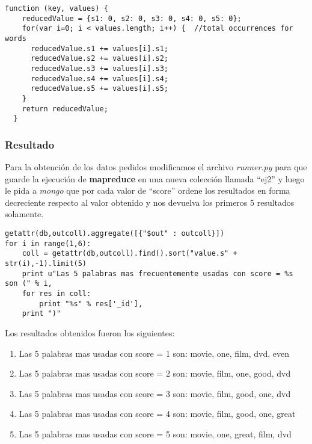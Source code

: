 \begin{lstlisting}[frame=leftline]
  function (key, values) { 
    reducedValue = {s1: 0, s2: 0, s3: 0, s4: 0, s5: 0};
    for(var i=0; i < values.length; i++) {	//total occurrences for words
      reducedValue.s1 += values[i].s1;
      reducedValue.s2 += values[i].s2;
      reducedValue.s3 += values[i].s3;
      reducedValue.s4 += values[i].s4;
      reducedValue.s5 += values[i].s5;
    }
    return reducedValue;
  }
\end{lstlisting}

\subsubsection{Resultado}

Para la obtención de los datos pedidos modificamos el archivo \textit{runner.py} para que guarde la ejecución de \textbf{mapreduce} en una nueva colección llamada ``ej2'' y luego le pida a \textit{mongo} que por cada valor de ``score'' ordene los resultados en forma decreciente respecto al valor obtenido y nos devuelva los primeros 5 resultados solamente.\\

\begin{lstlisting}[frame=leftline]
getattr(db,outcoll).aggregate([{"$out" : outcoll}])
for i in range(1,6):
	coll = getattr(db,outcoll).find().sort("value.s" + str(i),-1).limit(5)
	print u"Las 5 palabras mas frecuentemente usadas con score = %s son (" % i,
	for res in coll:
		print "%s" % res['_id'],
	print ")"
\end{lstlisting}

Los resultados obtenidos fueron los siguientes:

\begin{enumerate}
\item Las 5 palabras mas  usadas con score = 1 son: movie, one, film, dvd, even
\item Las 5 palabras mas  usadas con score = 2 son: movie, film, one, good, dvd 
\item Las 5 palabras mas  usadas con score = 3 son: movie, film, good, one, dvd 
\item Las 5 palabras mas  usadas con score = 4 son: movie, film, good, one, great
\item Las 5 palabras mas  usadas con score = 5 son: movie, one, great, film, dvd 
\end{enumerate}
